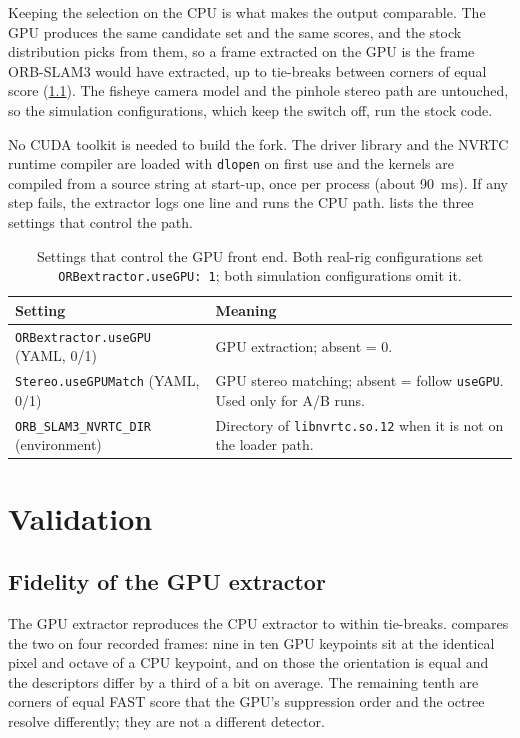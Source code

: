 \documentclass[11pt,a4paper,notitlepage]{report}
\begin{document}
Keeping the selection on the CPU is what makes the output comparable. The GPU
produces the same candidate set and the same scores, and the stock
distribution picks from them, so a frame extracted on the GPU is the frame
ORB-SLAM3 would have extracted, up to tie-breaks between corners of equal
score (\cref{sec:gpu-fidelity}). The fisheye camera model
\cite{kannala2006} and the pinhole stereo path are untouched, so the
simulation configurations, which keep the switch off, run the stock code.

No CUDA toolkit is needed to build the fork. The driver library and the NVRTC
runtime compiler \cite{nvidia2026nvrtc} are loaded with \texttt{dlopen} on
first use and the kernels are compiled from a source string at start-up, once
per process (about \SI{90}{\milli\second}). If any step fails, the extractor
logs one line and runs the CPU path.  lists the three
settings that control the path.

\begin{table}[htbp]
\centering
\caption{Settings that control the GPU front end. Both real-rig configurations
set \texttt{ORBextractor.useGPU: 1}; both simulation configurations omit it.}
\label{tab:gpu-keys}
\small
\begin{tabularx}{\textwidth}{lX}
\toprule
Setting & Meaning \\
\midrule
\texttt{ORBextractor.useGPU} (YAML, 0/1) & GPU extraction; absent = 0. \\
\texttt{Stereo.useGPUMatch} (YAML, 0/1) & GPU stereo matching; absent = follow \texttt{useGPU}. Used only for A/B runs. \\
\texttt{ORB\_SLAM3\_NVRTC\_DIR} (environment) & Directory of \texttt{libnvrtc.so.12} when it is not on the loader path. \\
\bottomrule
\end{tabularx}
\end{table}

\section{Validation}
\label{sec:gpu-validation}

\subsection{Fidelity of the GPU extractor}
\label{sec:gpu-fidelity}

The GPU extractor reproduces the CPU extractor to within tie-breaks.
 compares the two on four recorded frames: nine in ten
GPU keypoints sit at the identical pixel and octave of a CPU keypoint, and on
those the orientation is equal and the descriptors differ by a third of a bit
on average. The remaining tenth are corners of equal FAST score that the
GPU's suppression order and the octree resolve differently; they are not a
different detector.
\end{document}
